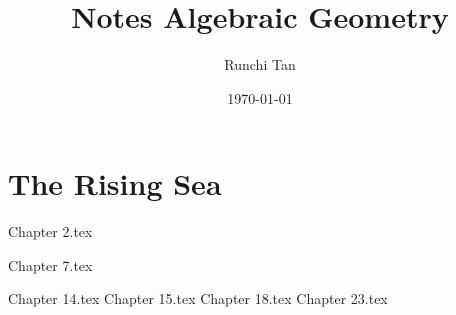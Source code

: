 \documentclass{article}
\title{Notes Algebraic Geometry}
\author{Runchi Tan}
\date{\today}
\begin{document}

\tableofcontents

\newpage\part{The Rising Sea}

{Chapter 2.tex}

{Chapter 7.tex}

{Chapter 14.tex}
{Chapter 15.tex}
{Chapter 18.tex}
{Chapter 23.tex}
\end{document}

